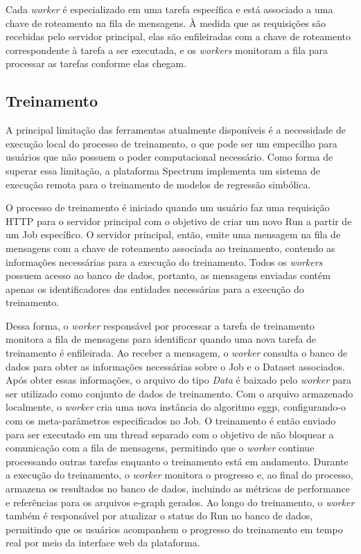 Cada \textit{worker} é especializado em uma tarefa específica e está associado a uma chave de roteamento na fila de mensagens. À medida que as requisições são recebidas pelo servidor principal, elas são enfileiradas com a chave de roteamento correspondente à tarefa a ser executada, e os \textit{workers} monitoram a fila para processar as tarefas conforme elas chegam.

\subsection{Treinamento}
A principal limitação das ferramentas atualmente disponíveis é a necessidade de execução local do processo de treinamento, o que pode ser um empecilho para usuários que não possuem o poder computacional necessário. Como forma de superar essa limitação, a plataforma Spectrum implementa um sistema de execução remota para o treinamento de modelos de regressão simbólica.

O processo de treinamento é iniciado quando um usuário faz uma requisição HTTP para o servidor principal com o objetivo de criar um novo Run a partir de um Job específico. O servidor principal, então, emite uma mensagem na fila de mensagens com a chave de roteamento associada ao treinamento, contendo as informações necessárias para a execução do treinamento. Todos os \textit{workers} possuem acesso ao banco de dados, portanto, as mensagens enviadas contém apenas os identificadores das entidades necessárias para a execução do treinamento.

Dessa forma, o \textit{worker} responsável por processar a tarefa de treinamento monitora a fila de mensagens para identificar quando uma nova tarefa de treinamento é enfileirada. Ao receber a mensagem, o \textit{worker} consulta o banco de dados para obter as informações necessárias sobre o Job e o Dataset associados. Após obter essas informações, o arquivo do tipo \textit{Data} é baixado pelo \textit{worker} para ser utilizado como conjunto de dados de treinamento. Com o arquivo armazenado localmente, o \textit{worker} cria uma nova instância do algoritmo eggp, configurando-o com os meta-parâmetros especificados no Job. O treinamento é então enviado para ser executado em um thread separado com o objetivo de não bloquear a comunicação com a fila de mensagens, permitindo que o \textit{worker} continue processando outras tarefas enquanto o treinamento está em andamento. Durante a execução do treinamento, o \textit{worker} monitora o progresso e, ao final do processo, armazena os resultados no banco de dados, incluindo as métricas de performance e referências para os arquivos e-graph gerados. Ao longo do treinamento, o \textit{worker} também é responsável por atualizar o status do Run no banco de dados, permitindo que os usuários acompanhem o progresso do treinamento em tempo real por meio da interface web da plataforma.

